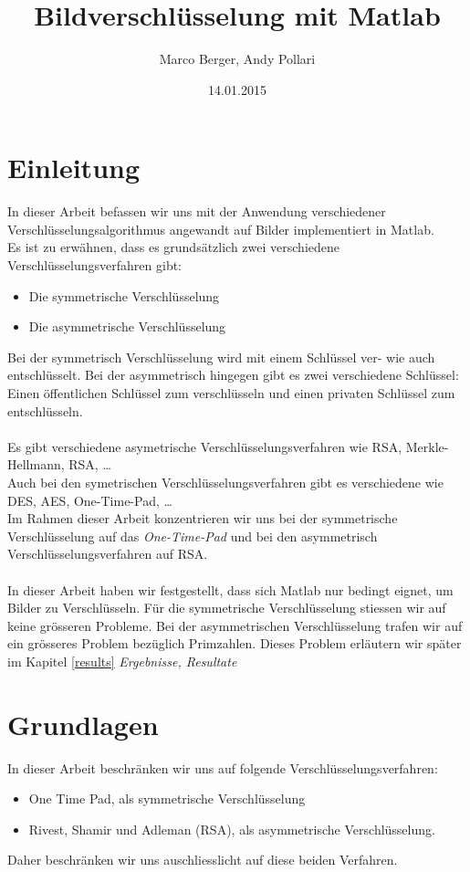 \documentclass[paper=a4,fontsize=12pt]{scrartcl}
\begin{document}
\title{Bildverschlüsselung mit Matlab}
\author{Marco Berger, Andy Pollari}
\date{14.01.2015}
\maketitle

\section{Einleitung}
In dieser Arbeit befassen wir uns mit der Anwendung verschiedener Verschlüsselungsalgorithmus
angewandt auf Bilder implementiert in Matlab. \\
Es ist zu erwähnen, dass es grundsätzlich zwei verschiedene Verschlüsselungsverfahren gibt:
\begin{itemize}
  \item Die symmetrische Verschlüsselung 
  \item Die asymmetrische Verschlüsselung 
\end{itemize}
Bei der symmetrisch Verschlüsselung wird mit einem Schlüssel ver- wie auch entschlüsselt.
Bei der asymmetrisch hingegen gibt es zwei verschiedene Schlüssel: Einen öffentlichen Schlüssel zum verschlüsseln
und einen privaten Schlüssel zum entschlüsseln. \\ \\
Es gibt verschiedene asymetrische Verschlüsselungsverfahren wie RSA, Merkle-Hellmann, RSA, \ldots \\
Auch bei den symetrischen Verschlüsselungsverfahren gibt es verschiedene wie DES, AES, One-Time-Pad, \ldots \\
Im Rahmen dieser Arbeit konzentrieren wir uns bei der symmetrische Verschlüsselung auf das \textit{One-Time-Pad} 
und bei den asymmetrisch Verschlüsselungsverfahren auf RSA. \\ \\
In dieser Arbeit haben wir festgestellt, dass sich Matlab nur bedingt eignet, um Bilder zu Verschlüsseln.
Für die symmetrische Verschlüsselung stiessen wir auf keine grösseren Probleme. Bei der asymmetrischen Verschlüsselung
trafen wir auf ein grösseres Problem bezüglich Primzahlen. Dieses Problem erläutern wir später im Kapitel \ref{results} \textit{Ergebnisse, Resultate}

\newpage 
\section{Grundlagen} 
In dieser Arbeit beschränken wir uns auf folgende Verschlüsselungsverfahren:
\begin{itemize}
  \item One Time Pad, als symmetrische Verschlüsselung
  \item Rivest, Shamir und Adleman (RSA), als asymmetrische Verschlüsselung.
\end{itemize} 
Daher beschränken wir uns auschliesslicht auf diese beiden Verfahren. 
\end{document}
